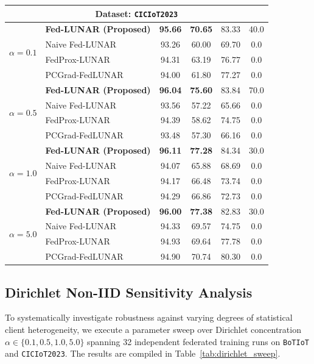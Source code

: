 \begin{table}[t]
{\begin{tabular}{clcccc}
\midrule
\multicolumn{6}{c}{\textbf{Dataset: \texttt{CICIoT2023}}} \\
\midrule
\multirow{4}{*}{$\alpha = 0.1$} 
& \textbf{Fed-LUNAR (Proposed)} & \textbf{95.66} & \textbf{70.65} & 83.33 & 40.0 \\
& Naive Fed-LUNAR & 93.26 & 60.00 & 69.70 & 0.0 \\
& FedProx-LUNAR & 94.31 & 63.19 & 76.77 & 0.0 \\
& PCGrad-FedLUNAR & 94.00 & 61.80 & 77.27 & 0.0 \\
\midrule
\multirow{4}{*}{$\alpha = 0.5$} 
& \textbf{Fed-LUNAR (Proposed)} & \textbf{96.04} & \textbf{75.60} & 83.84 & 70.0 \\
& Naive Fed-LUNAR & 93.56 & 57.22 & 65.66 & 0.0 \\
& FedProx-LUNAR & 94.39 & 58.62 & 74.75 & 0.0 \\
& PCGrad-FedLUNAR & 93.48 & 57.30 & 66.16 & 0.0 \\
\midrule
\multirow{4}{*}{$\alpha = 1.0$} 
& \textbf{Fed-LUNAR (Proposed)} & \textbf{96.11} & \textbf{77.28} & 84.34 & 30.0 \\
& Naive Fed-LUNAR & 94.07 & 65.88 & 68.69 & 0.0 \\
& FedProx-LUNAR & 94.17 & 66.48 & 73.74 & 0.0 \\
& PCGrad-FedLUNAR & 94.29 & 66.86 & 72.73 & 0.0 \\
\midrule
\multirow{4}{*}{$\alpha = 5.0$} 
& \textbf{Fed-LUNAR (Proposed)} & \textbf{96.00} & \textbf{77.38} & 82.83 & 30.0 \\
& Naive Fed-LUNAR & 94.33 & 69.57 & 74.75 & 0.0 \\
& FedProx-LUNAR & 94.93 & 69.64 & 77.78 & 0.0 \\
& PCGrad-FedLUNAR & 94.90 & 70.74 & 80.30 & 0.0 \\
\bottomrule
\end{tabular}
}
\end{table}

\subsection{Dirichlet Non-IID Sensitivity Analysis}
\label{subsec:sensitivity}

To systematically investigate robustness against varying degrees of statistical client heterogeneity, we execute a parameter sweep over Dirichlet concentration $\alpha \in \{0.1, 0.5, 1.0, 5.0\}$ spanning 32 independent federated training runs on \texttt{BoTIoT} and \texttt{CICIoT2023}. The results are compiled in Table~\ref{tab:dirichlet_sweep}.

